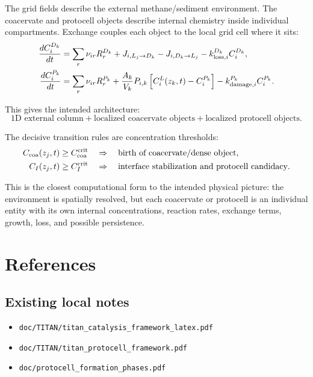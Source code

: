 \documentclass[11pt]{article}
\begin{document}
The grid fields describe the external methane/sediment environment. The coacervate and protocell objects describe internal chemistry inside individual compartments. Exchange couples each object to the local grid cell where it sits:
\begin{align}
\frac{dC_i^{D_k}}{dt}
&=
\sum_r \nu_{ir}R_r^{D_k}
+
J_{i,L_j\rightarrow D_k}
-
J_{i,D_k\rightarrow L_j}
-k_{{\rm loss},i}^{D_k}C_i^{D_k},
\\
\frac{dC_i^{P_k}}{dt}
&=
\sum_r \nu_{ir}R_r^{P_k}
+
\frac{A_k}{V_k}P_{i,k}
\left[C_i^L(z_k,t)-C_i^{P_k}\right]
-k_{{\rm damage},i}^{P_k}C_i^{P_k}.
\end{align}

This gives the intended architecture:
\begin{equation}
\text{1D external column}
+
\text{localized coacervate objects}
+
\text{localized protocell objects}.
\end{equation}

The decisive transition rules are concentration thresholds:
\begin{align}
C_{\rm coa}(z_j,t) &\ge C_{\rm coa}^{\rm crit}
\quad \Rightarrow \quad
\text{birth of coacervate/dense object},\\
C_I(z_j,t) &\ge C_I^{\rm crit}
\quad \Rightarrow \quad
\text{interface stabilization and protocell candidacy}.
\end{align}

This is the closest computational form to the intended physical picture: the environment is spatially resolved, but each coacervate or protocell is an individual entity with its own internal concentrations, reaction rates, exchange terms, growth, loss, and possible persistence.

\section{References}

\subsection*{Existing local notes}

\begin{itemize}
\item \texttt{doc/TITAN/titan\_catalysis\_framework\_latex.pdf}
\item \texttt{doc/TITAN/titan\_protocell\_framework.pdf}
\item \texttt{doc/protocell\_formation\_phases.pdf}
\end{itemize}
\end{document}
